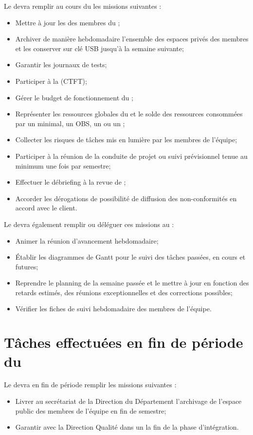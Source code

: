 \documentclass[11pt]{article}
\begin{document}
Le \CP{} devra remplir au cours du \PICCourt les missions suivantes :

\begin{itemize}
	\item Mettre à jour les \FC{} des membres du \PICCourt;
	\item Archiver de manière hebdomadaire l’ensemble des espaces privés des membres et les conserver sur clé USB jusqu’à la semaine suivante;
	\item Garantir les journaux de tests;
	\item Participer à la \CTFT (CTFT);
	\item Gérer le budget de fonctionnement du \PICCourt;
	\item Représenter les ressources globales du \PICCourt et le solde des ressources consommées par un \WBSCourt minimal, un OBS, un \RBSCourt{} ou un \FBSCourt;

	\item Collecter les risques de tâches mis en lumière par les membres de l’équipe;
	\item Participer à la réunion de la conduite de projet ou suivi prévisionnel tenue au minimum une fois par semestre;
	\item Effectuer le débriefing à la revue de \PICCourt;
	\item Accorder les dérogations de possibilité de diffusion des non-conformités en accord avec le client.
\end{itemize}

Le \CP{} devra également remplir ou déléguer ces missions au \CPA :
\begin{itemize}
	\item Animer la réunion d’avancement hebdomadaire;
	\item Établir les diagrammes de Gantt pour le suivi des tâches passées, en cours et futures;
	\item Reprendre le planning de la semaine passée et le mettre à jour en fonction des retards estimés, des réunions exceptionnelles et des corrections possibles;
	\item Vérifier les fiches de suivi hebdomadaire des membres de l’équipe.
\end{itemize}

\section*{Tâches effectuées en fin de période du \PICCourt}

Le \CP{} devra en fin de période remplir les missions suivantes :
\begin{itemize}
	\item Livrer au secrétariat de la Direction du Département \ASICourt{} l’archivage de l’espace public des membres de l’équipe en fin de semestre;
	\item Garantir avec la Direction Qualité dans un \PVCourt{} la fin de la phase d’intégration.
\end{itemize}
\end{document}
